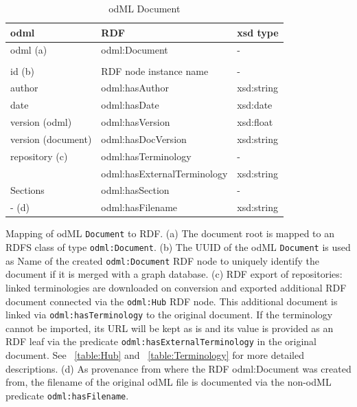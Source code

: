 \documentclass{article}
\begin{document}
\begin{table}
\begin{threeparttable}
\begin{tabular}{p{3.5cm}p{5cm}p{2cm}}
\toprule
    odml                    & RDF                                 & xsd type \\
\midrule
    odml (a)                & odml:Document                       & - \\
                            & & \\
    id (b)                  & RDF node instance name              & - \\
    author                  & odml:hasAuthor                      & xsd:string \\
    date                    & odml:hasDate                        & xsd:date \\
    version (odml)          & odml:hasVersion                     & xsd:float \\
    version (document)      & odml:hasDocVersion                  & xsd:string \\
    repository (c)          & odml:hasTerminology                 & - \\
                            & odml:hasExternalTerminology         & xsd:string \\
    Sections                & odml:hasSection                     & - \\
    - (d)                   & odml:hasFilename                    & xsd:string \\
\bottomrule
\end{tabular}
\caption{odML Document}
\begin{tablenotes}
\small
\item Mapping of odML \texttt{Document} to RDF. (a) The document root is mapped to an RDFS class of type \texttt{odml:Document}. (b) The UUID of the odML \texttt{Document} is used as Name of the created \texttt{odml:Document} RDF node to uniquely identify the document if it is merged with a graph database. (c) RDF export of repositories: linked terminologies are downloaded on conversion and exported additional RDF document connected via the \texttt{odml:Hub} RDF node. This additional document is linked via \texttt{odml:hasTerminology} to the original document. If the terminology cannot be imported, its URL will be kept as is and its value is provided as an RDF leaf via the predicate \texttt{odml:hasExternalTerminology} in the original document. See ~\ref{table:Hub} and ~\ref{table:Terminology} for more detailed descriptions.
(d) As provenance from where the RDF odml:Document was created from, the filename of the original odML file is documented via the non-odML predicate \texttt{odml:hasFilename}.
\end{tablenotes}
\label{table:Document}
\end{threeparttable}
\end{table}
\end{document}
